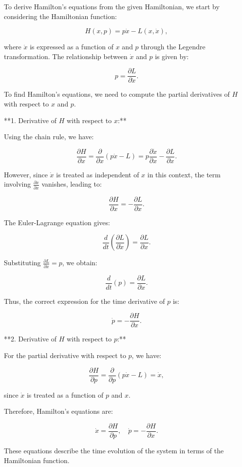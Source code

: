 To derive Hamilton's equations from the given Hamiltonian, we start by considering the Hamiltonian function:

$$
H(x, p) = p \dot{x} - L(x, \dot{x}),
$$

where \( \dot{x} \) is expressed as a function of \( x \) and \( p \) through the Legendre transformation. The relationship between \( \dot{x} \) and \( p \) is given by:

$$
p = \frac{\partial L}{\partial \dot{x}}.
$$

To find Hamilton's equations, we need to compute the partial derivatives of \( H \) with respect to \( x \) and \( p \).

**1. Derivative of \( H \) with respect to \( x \):**

Using the chain rule, we have:

$$
\frac{\partial H}{\partial x} = \frac{\partial}{\partial x} (p \dot{x} - L) = p \frac{\partial \dot{x}}{\partial x} - \frac{\partial L}{\partial x}.
$$

However, since \( \dot{x} \) is treated as independent of \( x \) in this context, the term involving \( \frac{\partial \dot{x}}{\partial x} \) vanishes, leading to:

$$
\frac{\partial H}{\partial x} = -\frac{\partial L}{\partial x}.
$$

The Euler-Lagrange equation gives:

$$
\frac{d}{dt} \left( \frac{\partial L}{\partial \dot{x}} \right) = \frac{\partial L}{\partial x}.
$$

Substituting \( \frac{\partial L}{\partial \dot{x}} = p \), we obtain:

$$
\frac{d}{dt}(p) = \frac{\partial L}{\partial x}.
$$

Thus, the correct expression for the time derivative of \( p \) is:

$$
\dot{p} = -\frac{\partial H}{\partial x}.
$$

**2. Derivative of \( H \) with respect to \( p \):**

For the partial derivative with respect to \( p \), we have:

$$
\frac{\partial H}{\partial p} = \frac{\partial}{\partial p} (p \dot{x} - L) = \dot{x},
$$

since \( \dot{x} \) is treated as a function of \( p \) and \( x \).

Therefore, Hamilton's equations are:

$$
\dot{x} = \frac{\partial H}{\partial p}, \quad \dot{p} = -\frac{\partial H}{\partial x}.
$$

These equations describe the time evolution of the system in terms of the Hamiltonian function.